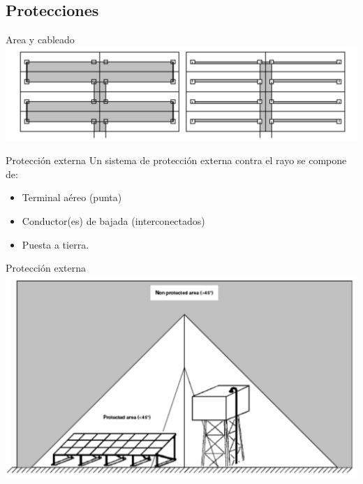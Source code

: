 \documentclass[xcolor={usenames,svgnames,dvipsnames}]{beamer}
\begin{document}
\subsection{Protecciones}
\label{sec-4-2}


\begin{frame}[label=sec-4-2-1]{Area y cableado}
\includegraphics[width=.9\linewidth]{../figs/BucleCableadoOptimo.pdf}
\end{frame}

\begin{frame}[label=sec-4-2-2]{Protección externa}
Un sistema de protección externa contra el rayo se compone de:

\begin{itemize}
\item Terminal aéreo (punta)

\item Conductor(es) de bajada (interconectados)

\item Puesta a tierra.
\end{itemize}
\end{frame}

\begin{frame}[label=sec-4-2-3]{Protección externa}
\includegraphics[width=.9\linewidth]{../figs/AreaProteccionPararrayos.pdf}
\end{frame}
\end{document}
